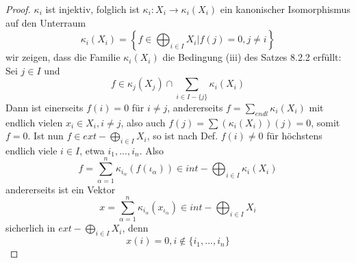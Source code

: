 \documentclass[12pt,a4paper]{article}
\theoremstyle{definition}
\theoremstyle{remark}
\begin{document}
	\begin{proof}
		$\kappa_i$ ist injektiv, folglich ist $\kappa_i: X_i \rightarrow \kappa_i(X_i)$ ein kanonischer Isomorphismus auf den Unterraum
		\begin{equation}
			\kappa_i(X_i) = \left\{ f \in \bigoplus_{i \in I} X_i \left| f(j)=0, j \neq i \right. \right\}
		\end{equation}
		wir zeigen, dass die Familie $\kappa_i(X_i)$ die Bedingung (iii) des Satzes 8.2.2 erfüllt: \\
		Sei $j \in I$ und
		\begin{equation}
			f \in \kappa_j(X_j) \cap \sum_{i \in I-\{ j \}} \kappa_i(X_i)
		\end{equation}
		Dann ist einerseits $f(i) =0$ für $i \neq j$, andererseits $f = \sum_{ endl} \kappa_i(X_i)$ mit endlich vielen $x_i \in X_i, i \neq j$, also auch $f(j) = \sum (\kappa_i(X_i))(j)=0$, somit $f=0$. Ist nun $f \in ext - \bigoplus_{i \in I} X_i$, so ist nach Def. $f(i) \neq 0$ für höchstens endlich viele $i \in I$, etwa $i_1,...,i_n$. Also
		\begin{equation}
			f = \sum_{\alpha =1}^n \kappa_{i_{\alpha}}(f(\iota_{\alpha})) \in int- \bigoplus_{i \in I} \kappa_i(X_{i})
		\end{equation}
		andererseits ist ein Vektor
		\begin{equation}
			x = \sum_{\alpha =1}^n \kappa_{i_{\alpha}} (x_{\iota_{\alpha}}) \in int-\bigoplus_{i \in I} X_i
		\end{equation}
		sicherlich in $ext-\bigoplus_{i \in I}X_i$, denn
		\begin{equation}
			x(i) =0, i \notin \{ i_1,...,i_n \}
		\end{equation}
	\end{proof}
	
	\newpage	
	
\end{document}
